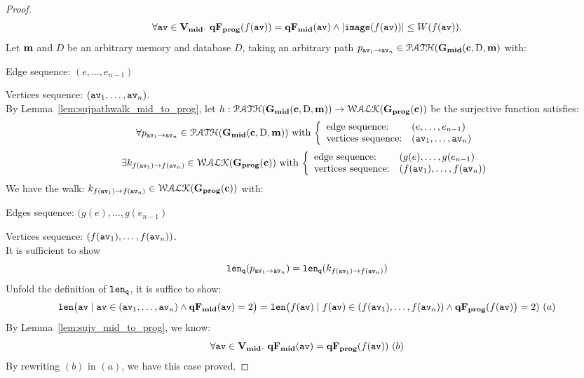 \begin{proof}
%
$$
\forall \mathtt{av} \in \mathtt{\bf{V_{mid}}}. ~ \mathtt{\bf{qF_{prog}}}(f(\mathtt{av})) = \mathtt{\bf{qF_{mid}}}(\mathtt{av}) 
\land |\mathtt{image}(f(\mathtt{av}))| \leq W(f(\mathtt{av})).
$$
%
%
%
Let ${\boldsymbol{\mathbf{m}}}$ and $D$ be an arbitrary memory and database $D$,
taking an arbitrary path $p_{\mathtt{av}_1 \to \mathtt{av}_n} \in \mathcal{PATH}(\mathtt{\bf{G_{mid}}}({\boldsymbol{\mathbf{c}}}, \text{D}, {\boldsymbol{\mathbf{m}}})$ with:
%
\item Edge sequence: $(e, \ldots, e_{n-1})$
%
\item Vertices sequence: $(\mathtt{av}_1, \ldots, \mathtt{av}_n)$.
\\
By Lemma~\ref{lem:sujpathwalk_mid_to_prog}, let $h: \mathcal{PATH}(\mathtt{\bf{G_{mid}}}({\boldsymbol{\mathbf{c}}}, \text{D}, {\boldsymbol{\mathbf{m}}})) \to \mathcal{WALK}(\mathtt{\bf{G_{prog}}}({\boldsymbol{\mathbf{c}}}))$ be the surjective function satisfies:
%
\[
  \forall p_{\av_1 \to \av_n} \in \paths(\midG(\ssa{c}, \text{D}, \ssa{m}))
  \text{ with }
  \left\{
  \begin{array}{ll}
  \mbox{edge sequence:} & (e, \ldots, e_{n-1})
  \\ 
  \mbox{vertices sequence:} & (\av_1, \ldots, \av_n)
  \end{array}
  \right.
\]
%
\[
  \exists k_{f(\av_1) \to f(\av_n)} \in \walks(\progG(\ssa{c}))
  \text{ with }
  \left\{
  \begin{array}{ll}
  \mbox{edge sequence:} & (g(e), \ldots, g(e_{n-1}) 
  \\ 
  \mbox{vertices sequence:} & (f(\av_1), \ldots, f(\av_{n}))
  \end{array}
  \right.
\]
%
We have the walk:
$k_{f(\mathtt{av}_1) \to f(\mathtt{av}_n)} \in \mathcal{WALK}(\mathtt{\bf{G_{prog}}}({\boldsymbol{\mathbf{c}}}))$ with:
%
\item Edges sequence: $(g(e), \ldots, g(e_{n-1}) $
%
\item Vertices sequence: $(f(\mathtt{av}_1), \ldots, f(\mathtt{av}_{n}))$.
\\
It is sufficient to show 
%
\[
  \mathtt{len}_{\tt q}(p_{\mathtt{av}_1 \to \mathtt{av}_n}) = \mathtt{len}_{\tt q}(k_{f(\mathtt{av}_1) \to f(\mathtt{av}_n)})
\]
%
Unfold the definition of $\mathtt{len}_{\tt q}$, it is suffice to show:
\[
\mathtt{len} \big( \mathtt{av} \mid \mathtt{av} \in (\mathtt{av}_1, \ldots, \mathtt{av}_n) \land \mathtt{\bf{qF_{mid}}}(\mathtt{av}) = 2 \big) 
= \mathtt{len} \big(f(\mathtt{av}) \mid f(\mathtt{av}) \in (f(\mathtt{av}_1), \ldots, f(\mathtt{av}_{n})) \land \mathtt{\bf{qF_{prog}}}(f(\mathtt{av})\big) = 2) 
~ (a)
\]
%
By Lemma~\ref{lem:sujv_mid_to_prog}, we know:
%
\[
  \forall \mathtt{av} \in \mathtt{\bf{V_{mid}}}. ~ \mathtt{\bf{qF_{mid}}}(\mathtt{av}) = \mathtt{\bf{qF_{prog}}}(f(\mathtt{av})) ~(b)
\]
By rewriting $(b)$ in $(a)$, we have this case proved.

\end{proof}